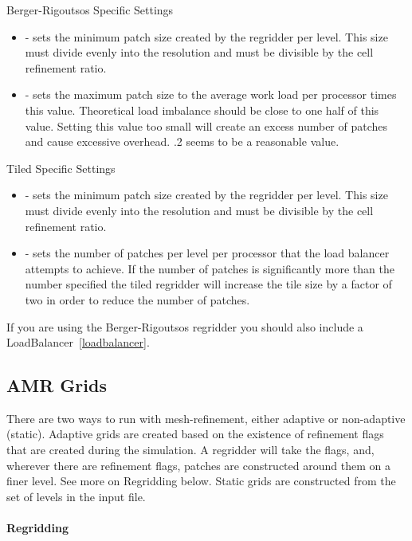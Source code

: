 Berger-Rigoutsos Specific Settings 

\begin{itemize}
\item {} - sets the minimum patch size created by the
  regridder per level. This size must divide evenly into the
  resolution and must be divisible by the cell refinement ratio.
\item {} - sets the maximum patch size to the
  average work load per processor times this value. Theoretical load
  imbalance should be close to one half of this value. Setting this
  value too small will create an excess number of patches and cause
  excessive overhead. .2 seems to be a reasonable value.
\end{itemize}

Tiled Specific Settings 
\begin{itemize}
\item {} - sets the minimum patch size created by the
  regridder per level. This size must divide evenly into the
  resolution and must be divisible by the cell refinement ratio.
\item {} - sets the number of patches per
  level per processor that the load balancer attempts to achieve. If
  the number of patches is significantly more than the number
  specified the tiled regridder will increase the tile size by a
  factor of two in order to reduce the number of patches.
\end{itemize}

If you are using the Berger-Rigoutsos regridder you should also
include a  LoadBalancer~\ref{loadbalancer}.


\subsection{AMR Grids}


There are two ways to run with mesh-refinement, either adaptive or
non-adaptive (static). Adaptive grids are created based on the
existence of refinement flags that are created during the
simulation. A regridder will take the flags, and, wherever there are
refinement flags, patches are constructed around them on a finer
level. See more on Regridding below. Static grids are constructed from
the set of levels in the input file.

\paragraph{Regridding}


